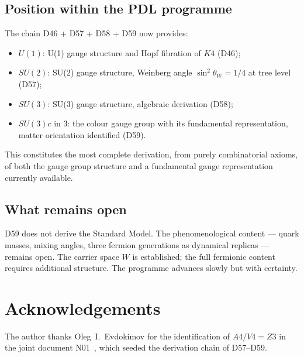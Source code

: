 \documentclass[11pt,a4paper]{article}
\def\Vfour{V4}%
\def\Afour{A4}%
\def\Zthree{Z3}%
\def\SUthree{SU(3)}%
\def\SUthreec{SU(3)c}%
\def\SUtwo{SU(2)}%
\def\Uone{U(1)}%
\def\Kfour{K4}%
\def\cong{=}%
\def\mathbb#1{#1}%
\def\mathrm#1{#1}%
\def\mathbf#1{#1}%
\theoremstyle{plain}
\theoremstyle{definition}
\theoremstyle{remark}
\newcommand{\Kfour}{K_4}
\newcommand{\Afour}{A_4}
\newcommand{\Vfour}{V_4}
\newcommand{\Zthree}{\mathbb{Z}_3}
\newcommand{\SUthree}{\mathrm{SU}(3)}
\newcommand{\SUthreec}{\mathrm{SU}(3)_c}
\newcommand{\SUtwo}{\mathrm{SU}(2)}
\newcommand{\Uone}{\mathrm{U}(1)}
\begin{document}
\subsection{Position within the PDL programme}

The chain D46 + D57 + D58 + D59 now provides:
\begin{itemize}[leftmargin=2em]
\item $\Uone$: U(1) gauge structure and Hopf fibration of $\Kfour$ (D46);
\item $\SUtwo$: SU(2) gauge structure, Weinberg angle $\sin^2\theta_W = 1/4$ at tree level (D57);
\item $\SUthree$: SU(3) gauge structure, algebraic derivation (D58);
\item $\SUthreec$ in $\mathbf{3}$: the colour gauge group with its fundamental representation, matter orientation identified (D59).
\end{itemize}
This constitutes the most complete derivation, from purely combinatorial axioms, of both the gauge group structure and a fundamental gauge representation currently available.

\subsection{What remains open}

D59 does not derive the Standard Model. The phenomenological content --- quark masses, mixing angles, three fermion generations as dynamical replicas --- remains open. The carrier space $W$ is established; the full fermionic content requires additional structure. The programme advances slowly but with certainty.

\section*{Acknowledgements}

The author thanks Oleg~I.~Evdokimov for the identification of $\Afour/\Vfour \cong \Zthree$ in the joint document N01~\cite{PDL_N01}, which seeded the derivation chain of D57--D59.



\end{document}
